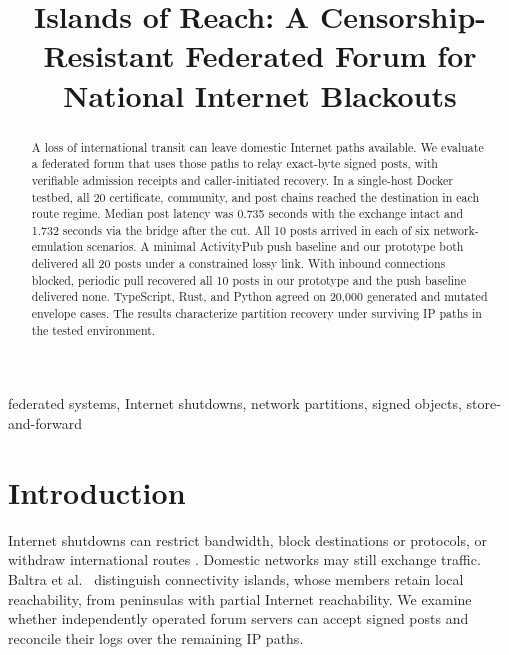 \documentclass[conference,a4paper,10pt]{IEEEtran}
\begin{document}
\title{Islands of Reach: A Censorship-Resistant Federated Forum for
National Internet Blackouts}

\author{%
}

\maketitle
\thispagestyle{iccitfirstpage}

\begin{abstract}
A loss of international transit can leave domestic Internet paths available. We evaluate a federated forum that uses those paths to relay exact-byte signed posts, with verifiable admission receipts and caller-initiated recovery. In a single-host Docker testbed, all 20 certificate, community, and post chains reached the destination in each route regime. Median post latency was 0.735 seconds with the exchange intact and 1.732 seconds via the bridge after the cut. All 10 posts arrived in each of six network-emulation scenarios. A minimal ActivityPub push baseline and our prototype both delivered all 20 posts under a constrained lossy link. With inbound connections blocked, periodic pull recovered all 10 posts in our prototype and the push baseline delivered none. TypeScript, Rust, and Python agreed on 20,000 generated and mutated envelope cases. The results characterize partition recovery under surviving IP paths in the tested environment.
\end{abstract}

\begin{IEEEkeywords}
federated systems, Internet shutdowns, network partitions, signed objects, store-and-forward
\end{IEEEkeywords}

\section{Introduction}

Internet shutdowns can restrict bandwidth, block destinations or protocols, or withdraw international routes \cite{ooni2025bangladesh,bischof2023shutdowns}. Domestic networks may still exchange traffic. Baltra et al.~\cite{baltra2024connectivity} distinguish connectivity islands, whose members retain local reachability, from peninsulas with partial Internet reachability. We examine whether independently operated forum servers can accept signed posts and reconcile their logs over the remaining IP paths.
\end{document}
